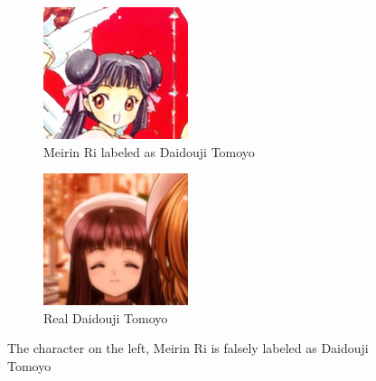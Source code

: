 \documentclass[11.5pt]{article}
\begin{document}
\begin{figure}[h!]
    \begin{subfigure}[b]{0.4\linewidth}
        \includegraphics{../data_set/moeimouto-faces/074_daidouji_tomoyo/face_795_301_69.png}
        \caption{Meirin Ri labeled as Daidouji Tomoyo}
    \end{subfigure}
    \begin{subfigure}[b]{0.4\linewidth}
        \includegraphics{../data_set/moeimouto-faces/074_daidouji_tomoyo/face_451_275_121.png}
        \caption{Real Daidouji Tomoyo}
    \end{subfigure}
    \caption{The character on the left, Meirin Ri is falsely labeled as Daidouji Tomoyo}
\end{figure}
\end{document}
